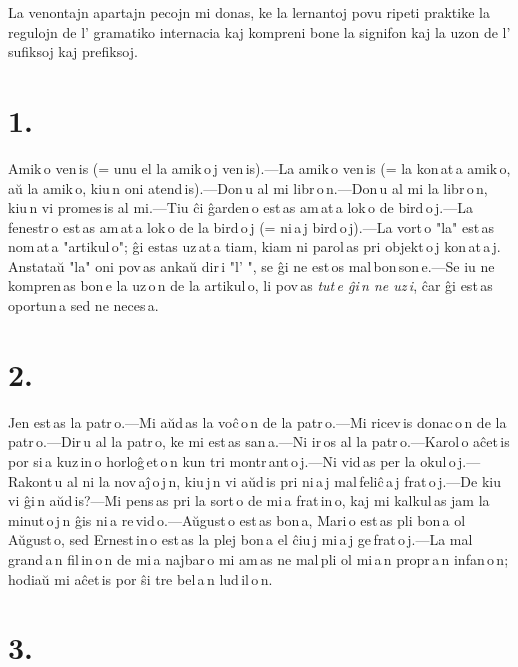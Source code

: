 \documentclass[ngerman,12pt,twoside]{book}
\begin{document}
La venontajn apartajn pecojn mi donas, ke la lernantoj povu ripeti praktike la regulojn de l' gramatiko internacia kaj kompreni bone la signifon kaj la uzon de l' sufiksoj kaj prefiksoj.

\section*{1.}

Amik\,o ven\,is (= unu el la amik\,o\,j ven\,is).---La amik\,o ven\,is (= la kon\,at\,a amik\,o, aŭ la amik\,o, kiu\,n oni atend\,is).---Don\,u al mi libr\,o\,n.---Don\,u al mi la libr\,o\,n, kiu\,n vi promes\,is al mi.---Tiu ĉi ĝarden\,o est\,as am\,at\,a lok\,o de bird\,o\,j.---La fenestr\,o est\,as am\,at\,a lok\,o de la bird\,o\,j (= ni\,a\,j bird\,o\,j).---La vort\,o "la" est\,as nom\,at\,a "artikul\,o"; ĝi estas uz\,at\,a tiam, kiam ni parol\,as pri objekt\,o\,j kon\,at\,a\,j. Anstataŭ "la" oni pov\,as ankaŭ dir\,i "l' ", se ĝi ne est\,os mal\,bon\,son\,e.---Se iu ne kompren\,as bon\,e la uz\,o\,n de la artikul\,o, li pov\,as \emph{tut\,e ĝi\,n ne uz\,i}, ĉar ĝi est\,as oportun\,a sed ne neces\,a. 

\section*{2.}

Jen est\,as la patr\,o.---Mi aŭd\,as la voĉ\,o\,n de la patr\,o.---Mi ricev\,is donac\,o\,n de la patr\,o.---Dir\,u al la patr\,o, ke mi est\,as san\,a.---Ni ir\,os al la patr\,o.---Karol\,o aĉet\,is por si\,a kuz\,in\,o horloĝ\,et\,o\,n kun tri montr\,ant\,o\,j.---Ni vid\,as per la okul\,o\,j.---Rakont\,u al ni la nov\,aĵ\,o\,j\,n, kiu\,j\,n vi aŭd\,is pri ni\,a\,j mal\,feliĉ\,a\,j frat\,o\,j.---De kiu vi ĝi\,n aŭd\,is?---Mi pens\,as pri la sort\,o de mi\,a frat\,in\,o, kaj mi kalkul\,as jam la minut\,o\,j\,n ĝis ni\,a re\,vid\,o.---Aŭgust\,o est\,as bon\,a, Mari\,o est\,as pli bon\,a ol Aŭgust\,o, sed Ernest\,in\,o est\,as la plej bon\,a el ĉiu\,j mi\,a\,j ge\,frat\,o\,j.---La mal\,grand\,a\,n fil\,in\,o\,n de mi\,a najbar\,o mi am\,as ne mal\,pli ol mi\,a\,n propr\,a\,n infan\,o\,n; hodiaŭ mi aĉet\,is por ŝi tre bel\,a\,n lud\,il\,o\,n. 

\section*{3.}
\end{document}
